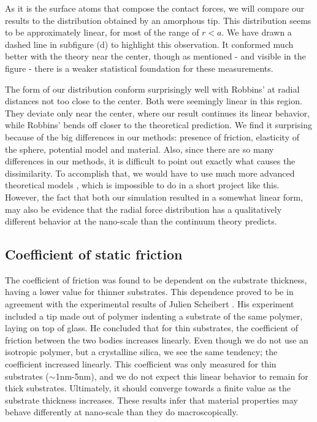 \documentclass[twoside,english]{uiofysmaster}
\begin{document}
As it is the surface atoms that compose the contact forces, we will compare our results to the distribution obtained by an amorphous tip.
This distribution seems to be approximately linear, for most of the range of $r<a$. 
We have drawn a dashed line in subfigure (d) to highlight this observation. 
It conformed much better with the theory near the center, though as mentioned - and visible in the figure - there is a weaker statistical foundation for these measurements.

The form of our distribution conform surprisingly well with Robbins' at radial distances not too close to the center. Both were seemingly linear in this region. 
They deviate only near the center, where our result continues its linear behavior, while Robbins' bends off closer to the theoretical prediction.
We find it surprising because of the big differences in our methods: presence of friction, elasticity of the sphere, potential model and material. 
Also, since there are so many differences in our methods, it is difficult to point out exactly what causes the dissimilarity. 
To accomplish that, we would have to use much more advanced theoretical models \cite{Johnson1985}, which is impossible to do in a short project like this. 
However, the fact that both our simulation resulted in a somewhat linear form, may also be evidence that the radial force distribution has a qualitatively different behavior at the nano-scale than the continuum theory predicts.


 





\subsection{Coefficient of static friction}
The coefficient of friction was found to be dependent on the substrate thickness, having a lower value for thinner substrates. 
This dependence proved to be in agreement with the experimental results of Julien Scheibert \cite{Scheibert2017}. 
His experiment included a tip made out of polymer indenting a substrate of the same polymer, laying on top of glass.
He concluded that for thin substrates, the coefficient of friction between the two bodies increases linearly. 
Even though we do not use an isotropic polymer, but a crystalline silica, we see the same tendency; 
the coefficient increased linearly. 
This coefficient was only measured for thin substrates ($\sim$1nm-5nm), and we do not expect this linear behavior to remain for thick substrates. 
Ultimately, it should converge towards a finite value as the substrate thickness increases.
These results infer that material properties may behave differently at nano-scale than they do macroscopically. 
\end{document}
